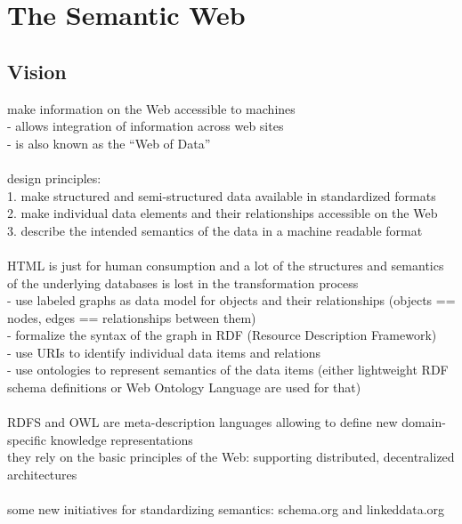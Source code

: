 
\section{The Semantic Web}
\label{sec:semantic_web}

\subsection{Vision}
\label{sec:semantic_vision}

make information on the Web accessible to machines \\
- allows integration of information across web sites \\
- is also known as the ``Web of Data'' \\
\\
design principles: \\
1. make structured and semi-structured data available in standardized formats \\
2. make individual data elements and their relationships accessible on the Web \\
3. describe the intended semantics of the data in a machine readable format \\
\\
HTML is just for human consumption and a lot of the structures and semantics of the
underlying databases is lost in the transformation process \\
- use labeled graphs as data model for objects and their relationships (objects == nodes,
edges == relationships between them) \\
- formalize the syntax of the graph in RDF (Resource Description Framework) \\
- use URIs to identify individual data items and relations \\
- use ontologies to represent semantics of the data items (either lightweight RDF schema definitions
or Web Ontology Language are used for that) \\
\\
RDFS and OWL are meta-description languages allowing to define new domain-specific knowledge representations \\
they rely on the basic principles of the Web: supporting distributed, decentralized architectures \\
\\
some new initiatives for standardizing semantics: schema.org and linkeddata.org \\

